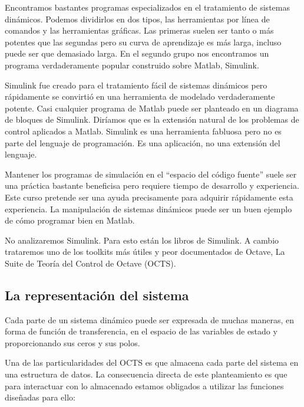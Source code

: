 Encontramos bastantes programas especializados en el tratamiento de
sistemas dinámicos. Podemos dividirlos en dos tipos, las herramientas
por línea de comandos y las herramientas gráficas. Las primeras suelen
ser tanto o más potentes que las segundas pero su curva de aprendizaje
es más larga, incluso puede ser que demasiado larga. En el segundo
grupo nos encontramos un programa verdaderamente popular construido
sobre Matlab, Simulink.

Simulink fue creado para el tratamiento fácil de sistemas dinámicos
pero rápidamente se convirtió en una herramienta de modelado verdaderamente
potente. Casi cualquier programa de Matlab puede ser planteado en
un diagrama de bloques de Simulink. Diríamos que es la extensión natural
de los problemas de control aplicados a Matlab. Simulink es una herramienta
fabluosa pero no es parte del lenguaje de programación. Es una aplicación,
no una extensión del lenguaje.

Mantener los programas de simulación en el {}``espacio del código
fuente'' suele ser una práctica bastante beneficisa pero requiere
tiempo de desarrollo y experiencia. Este curso pretende ser una ayuda
precisamente para adquirir rápidamente esta experiencia. La manipulación
de sistemas dinámicos puede ser un buen ejemplo de cómo programar
bien en Matlab.

No analizaremos Simulink. Para esto están los libros de Simulink.
A cambio trataremos uno de los toolkits más útiles y peor documentados
de Octave, La Suite de Teoría del Control de Octave (OCTS).


\subsection{La representación del sistema}

Cada parte de un sistema dinámico puede ser expresada de muchas
maneras, en forma de función de transferencia, en el espacio de las
variables de estado y proporcionando sus ceros y sus polos.

Una de las particularidades del OCTS es que almacena cada parte del
sistema en una estructura de datos. La consecuencia directa de este
planteamiento es que para interactuar con lo almacenado estamos
obligados a utilizar las funciones diseñadas para ello:

